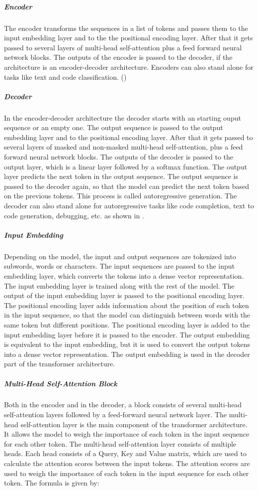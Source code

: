 \subparagraph{Encoder}

The encoder transforms the sequences in a list of tokens and passes them to the input embedding layer and to the the positional encoding layer. After that it gets passed to several layers of multi-head self-attention plus a feed forward neural network blocks. The outputs of the encoder is passed to the decoder, if the architecture is an encoder-decoder architecture. Encoders can also stand alone for tasks like text and code classification. (\cite{Hou.8212023})

\subparagraph{Decoder}

In the encoder-decoder architecture the decoder starts with an starting ouput sequence or an empty one. The output sequence is passed to the output embedding layer and to the positional encoding layer. After that it gets passed to several layers of masked and non-masked multi-head self-attention, plus a feed forward neural network blocks. The outputs of the decoder is passed to the output layer, which is a linear layer followed by a softmax function. The output layer predicts the next token in the output sequence. The output sequence is passed to the decoder again, so that the model can predict the next token based on the previous tokens. This process is called autoregressive generation.
The decoder can also stand alone for autoregressive tasks like code completion, text to code generation, debugging, etc. as shown in \cite{Hou.8212023}.

\subparagraph{Input Embedding}
Depending on the model, the input and output sequences are tokenized into subwords, words or characters. The input sequences are passed to the input embedding layer, which converts the tokens into a dense vector representation. The input embedding layer is trained along with the rest of the model. The output of the input embedding layer is passed to the positional encoding layer. The positional encoding layer adds information about the position of each token in the input sequence, so that the model can distinguish between words with the same token but different positions. The positional encoding layer is added to the input embedding layer before it is passed to the encoder. The output embedding is equivalent to the input embedding, but it is used to convert the output tokens into a dense vector representation. The output embedding is used in the decoder part of the transformer architecture.

\subparagraph{Multi-Head Self-Attention Block}

Both in the encoder and in the decoder, a block consists of several multi-head self-attention layers followed by a feed-forward neural network layer. The multi-head self-attention layer is the main component of the transformer architecture. It allows the model to weigh the importance of each token in the input sequence for each other token. The multi-head self-attention layer consists of multiple heads. Each head consists of a Query, Key and Value matrix, which are used to calculate the attention scores between the input tokens. The attention scores are used to weigh the importance of each token in the input sequence for each other token. The formula is given by:

